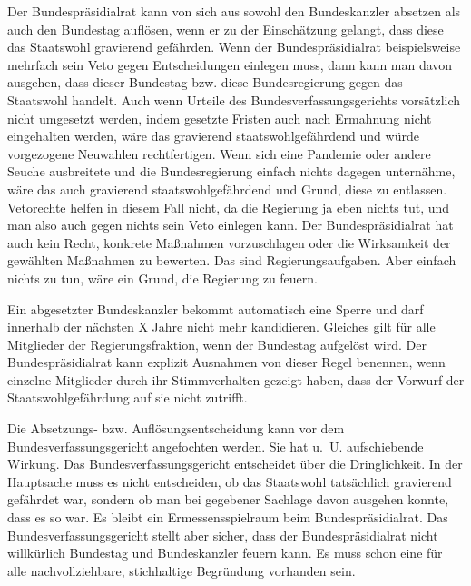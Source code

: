 \label{absetzung_durch_bundespraesidialrat}

Der Bundespräsidialrat kann von sich aus sowohl den Bundeskanzler absetzen als auch den Bundestag auflösen, wenn er zu der Einschätzung gelangt, dass diese das Staatswohl gravierend gefährden.
Wenn der Bundespräsidialrat beispielsweise mehrfach sein Veto gegen Entscheidungen einlegen muss, dann kann man davon ausgehen, dass dieser Bundestag bzw. diese Bundesregierung gegen das Staatswohl handelt.
Auch wenn Urteile des Bundesverfassungsgerichts vorsätzlich nicht umgesetzt werden, indem gesetzte Fristen auch nach Ermahnung nicht eingehalten werden, wäre das gravierend staatswohlgefährdend und würde vorgezogene Neuwahlen rechtfertigen.
Wenn sich eine Pandemie oder andere Seuche ausbreitete und die Bundesregierung einfach nichts dagegen unternähme, wäre das auch gravierend staatswohlgefährdend und Grund, diese zu entlassen.
Vetorechte helfen in diesem Fall nicht, da die Regierung ja eben nichts tut, und man also auch gegen nichts sein Veto einlegen kann.
Der Bundespräsidialrat hat auch kein Recht, konkrete Maßnahmen vorzuschlagen oder die Wirksamkeit der gewählten Maßnahmen zu bewerten.
Das sind Regierungsaufgaben.
Aber einfach nichts zu tun, wäre ein Grund, die Regierung zu feuern.

Ein abgesetzter Bundeskanzler bekommt automatisch eine Sperre und darf innerhalb der nächsten X Jahre nicht mehr kandidieren.
Gleiches gilt für alle Mitglieder der Regierungsfraktion, wenn der Bundestag aufgelöst wird.
Der Bundespräsidialrat kann explizit Ausnahmen von dieser Regel benennen, wenn einzelne Mitglieder durch ihr Stimmverhalten gezeigt haben, dass der Vorwurf der Staatswohlgefährdung auf sie nicht zutrifft.

Die Absetzungs- bzw. Auflösungsentscheidung kann vor dem Bundesverfassungsgericht angefochten werden.
Sie hat u.~U. aufschiebende Wirkung.
Das Bundesverfassungsgericht entscheidet über die Dringlichkeit.
In der Hauptsache muss es nicht entscheiden, ob das Staatswohl tatsächlich gravierend gefährdet war, sondern ob man bei gegebener Sachlage davon ausgehen konnte, dass es so war.
Es bleibt ein Ermessensspielraum beim Bundespräsidialrat.
Das Bundesverfassungsgericht stellt aber sicher, dass der Bundespräsidialrat nicht willkürlich Bundestag und Bundeskanzler feuern kann.
Es muss schon eine für alle nachvollziehbare, stichhaltige Begründung vorhanden sein.